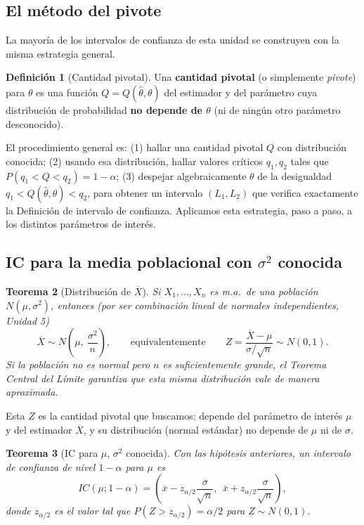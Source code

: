 \documentclass[11pt,a4paper]{article}
\theoremstyle{plain}
\newtheorem{teorema}{Teorema}[section]
\theoremstyle{definition}
\newtheorem{definicion}[teorema]{Definición}
\theoremstyle{remark}
\begin{document}
\subsection{El método del pivote}

La mayoría de los intervalos de confianza de esta unidad se construyen con la misma estrategia general.

\begin{definicion}[Cantidad pivotal]
Una \textbf{cantidad pivotal} (o simplemente \emph{pivote}) para $\theta$ es una función $Q=Q(\widehat\theta,\theta)$ del estimador y del parámetro cuya distribución de probabilidad \textbf{no depende de $\theta$} (ni de ningún otro parámetro desconocido).
\end{definicion}

El procedimiento general es: (1) hallar una cantidad pivotal $Q$ con distribución conocida; (2) usando esa distribución, hallar valores críticos $q_1,q_2$ tales que $P(q_1<Q<q_2)=1-\alpha$; (3) despejar algebraicamente $\theta$ de la desigualdad $q_1<Q(\widehat\theta,\theta)<q_2$, para obtener un intervalo $(L_1,L_2)$ que verifica exactamente la Definición de intervalo de confianza. Aplicamos esta estrategia, paso a paso, a los distintos parámetros de interés.

\subsection{IC para la media poblacional con \texorpdfstring{$\sigma^2$}{sigma\texttwosuperior} conocida}

\begin{teorema}[Distribución de $\overline X$]
Si $X_1,\dots,X_n$ es m.a.\ de una población $N(\mu,\sigma^2)$, entonces (por ser combinación lineal de normales independientes, Unidad 5)
\[
\overline X \sim N\left(\mu,\ \frac{\sigma^2}{n}\right), \qquad\text{equivalentemente}\qquad Z=\frac{\overline X-\mu}{\sigma/\sqrt n}\sim N(0,1).
\]
Si la población no es normal pero $n$ es suficientemente grande, el Teorema Central del Límite garantiza que esta misma distribución vale de manera aproximada.
\end{teorema}

Esta $Z$ es la cantidad pivotal que buscamos: depende del parámetro de interés $\mu$ y del estimador $\overline X$, y su distribución (normal estándar) no depende de $\mu$ ni de $\sigma$.

\begin{teorema}[IC para $\mu$, $\sigma^2$ conocida]\label{teo:icmuconocida}
Con las hipótesis anteriores, un intervalo de confianza de nivel $1-\alpha$ para $\mu$ es
\[
IC(\mu;1-\alpha) = \left(\overline x - z_{\alpha/2}\frac{\sigma}{\sqrt n},\ \ \overline x+z_{\alpha/2}\frac{\sigma}{\sqrt n}\right),
\]
donde $z_{\alpha/2}$ es el valor tal que $P(Z>z_{\alpha/2})=\alpha/2$ para $Z\sim N(0,1)$.
\end{teorema}
\end{document}
